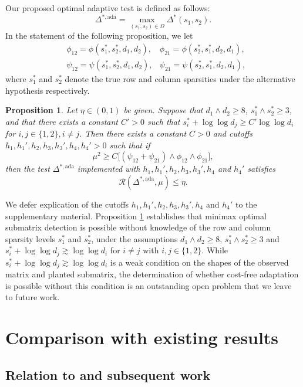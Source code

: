 \documentclass{article}
\newcommand{\cR}{\mathcal{R}}
\newtheorem{proposition}{Proposition}
\theoremstyle{remark}
\begin{document}
Our proposed optimal adaptive test is defined as follows:
\begin{equation}
    \Delta^{*, \text{ada}} = \max_{(s_1, s_2) \in \Omega}\Delta^*(s_1, s_2).
\end{equation}
In the statement of the following proposition, we let 
\begin{align*}
    &\phi_{12} = \phi(s^*_1,s^*_2, d_1,d_2),
    &\phi_{21} = \phi(s^*_2,s^*_1, d_2,d_1),\,\\
    &\psi_{12} = \psi(s^*_1,s^*_2, d_1,d_2),
    &\psi_{21} = \psi(s^*_2,s^*_1, d_2,d_1),
\end{align*}
where $s_1^*$ and $s_2^*$ denote the true row and column sparsities under the alternative hypothesis respectively.
\begin{proposition}\label{prop_ada_ub}
    Let $\eta \in (0,1)$ be given. Suppose that $d_1 \land d_2 \geq 8$, $s^*_1 \land s_2^* \geq 3$, and that there exists a constant $C' > 0$ such that $s_i^* + \log \log d_j \geq C' \log \log d_i$ for $i, j \in \{1,2\}, i \neq j$. Then there exists a constant $C > 0$ and cutoffs $h_1, h_1', h_2, h_3,h_3', h_4, h_4' > 0$ such that if
    \[\mu^2 \geq C\big[(\psi_{12} + \psi_{21}) \land \phi_{12} \land \phi_{21}\big],\]
    then the test $\Delta^{*, \text{ada}}$ implemented with $h_1, h_1', h_2, h_3, h_3', h_4$ and $h_4'$ satisfies
    \[\cR(\Delta^{*, \text{ada}}, \mu) \leq \eta.\]
\end{proposition}
We defer explication of the cutoffs $h_1, h_1', h_2, h_3, h_3', h_4$ and $h_4'$ to the supplementary material. Proposition \ref{prop_ada_ub} establishes that minimax optimal submatrix detection is possible without knowledge of the row and column sparsity levels $s_1^*$ and $s_2^*$, under the assumptions $d_1 \land d_2 \geq 8$, $s^*_1 \land s_2^* \geq 3$ and $s_i^* + \log \log d_{j} \gtrsim\log \log d_i$ for $i \neq j$ with $i,j \in \{1,2\}$. While $s_i^* + \log \log d_j \gtrsim\log \log d_i$ is a weak condition on the shapes of the observed matrix and planted submatrix, the determination of whether cost-free adaptation is possible without this condition is an outstanding open problem that we leave to future work.


\section{Comparison with existing results}\label{sec_comparison}
\subsection{Relation to \citet{butucea2013detection} and subsequent work}
\end{document}
